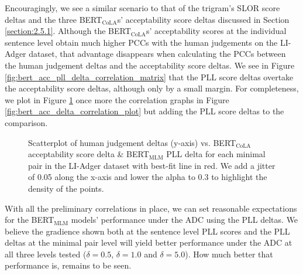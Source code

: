Encouragingly, we see a similar scenario to that of the trigram's SLOR score deltas and the three BERT$_{\mathrm{CoLA}}$s' acceptability score deltas discussed in Section \ref{section:2.5.1}.  Although the BERT$_{\mathrm{CoLA}}$s' acceptability scores at the individual sentence level obtain much higher PCCs with the human judgements on the LI-Adger dataset, that advantage disappears when calculating the PCCs between the human judgement deltas and the acceptability score deltas.  We see in Figure \ref{fig:bert_acc_pll_delta_correlation_matrix} that the PLL score deltas overtake the acceptability score deltas, although only by a small margin.  For completeness, we plot in Figure \ref{fig:bert_acc_pll_delta_correlation_plot} once more the correlation graphs in Figure \ref{fig:bert_acc_delta_correlation_plot} but adding the PLL score deltas to the comparison.
\begin{figure}[h]
    \caption[Human judgements vs. BERT acceptability \& PLL scores \newline on LI-Adger minimal pairs]{Scatterplot of human judgement deltas (y-axis) vs. BERT$_{\mathrm{CoLA}}$ acceptability score delta \& BERT$_{\mathrm{MLM}}$ PLL delta for each minimal pair in the LI-Adger dataset with best-fit line in red.  We add a jitter of 0.05 along the x-axis and lower the alpha to 0.3 to highlight the density of the points.}
    \label{fig:bert_acc_pll_delta_correlation_plot}
\end{figure}

With all the preliminary correlations in place, we can set reasonable expectations for the BERT$_{\mathrm{MLM}}$ models' performance under the ADC using the PLL deltas.  We believe the gradience shown both at the sentence level PLL scores and the PLL deltas at the minimal pair level will yield better performance under the ADC at all three levels tested ($\delta=0.5$, $\delta=1.0$ and $\delta=5.0$).  How much better that performance is, remains to be seen.

